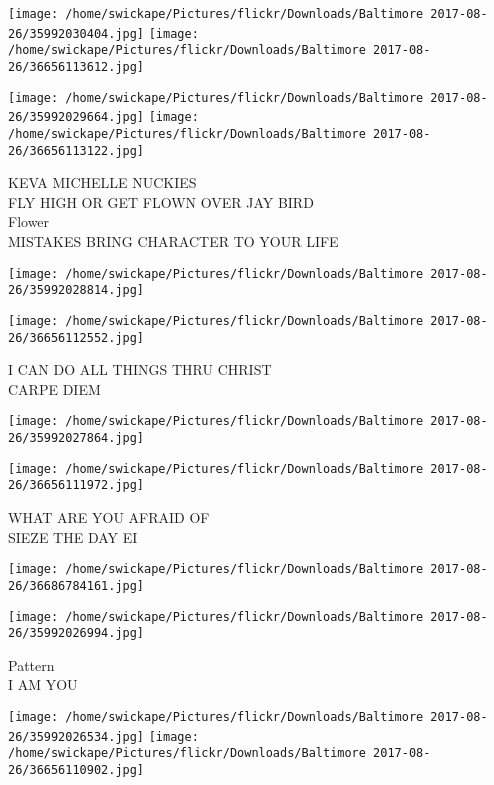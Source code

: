 \documentclass[10pt,letterpaper]{article}
\begin{document}
\texttt{[image: /home/swickape/Pictures/flickr/Downloads/Baltimore 2017-08-26/35992030404.jpg]}
\texttt{[image: /home/swickape/Pictures/flickr/Downloads/Baltimore 2017-08-26/36656113612.jpg]}

\texttt{[image: /home/swickape/Pictures/flickr/Downloads/Baltimore 2017-08-26/35992029664.jpg]}
\texttt{[image: /home/swickape/Pictures/flickr/Downloads/Baltimore 2017-08-26/36656113122.jpg]}

KEVA MICHELLE NUCKIES\\
FLY HIGH OR GET FLOWN OVER JAY BIRD\\
Flower\\
MISTAKES BRING CHARACTER TO YOUR LIFE\\
\pagebreak

\texttt{[image: /home/swickape/Pictures/flickr/Downloads/Baltimore 2017-08-26/35992028814.jpg]}

\vspace{0.25in}
\texttt{[image: /home/swickape/Pictures/flickr/Downloads/Baltimore 2017-08-26/36656112552.jpg]}

I CAN DO ALL THINGS THRU CHRIST\\
CARPE DIEM\\
\pagebreak

\texttt{[image: /home/swickape/Pictures/flickr/Downloads/Baltimore 2017-08-26/35992027864.jpg]}

\vspace{0.25in}
\texttt{[image: /home/swickape/Pictures/flickr/Downloads/Baltimore 2017-08-26/36656111972.jpg]}

WHAT ARE YOU AFRAID OF\\
SIEZE THE DAY EI\\
\pagebreak

\texttt{[image: /home/swickape/Pictures/flickr/Downloads/Baltimore 2017-08-26/36686784161.jpg]}

\vspace{0.25in}
\texttt{[image: /home/swickape/Pictures/flickr/Downloads/Baltimore 2017-08-26/35992026994.jpg]}

Pattern\\
I AM YOU\\
\pagebreak

\texttt{[image: /home/swickape/Pictures/flickr/Downloads/Baltimore 2017-08-26/35992026534.jpg]}
\texttt{[image: /home/swickape/Pictures/flickr/Downloads/Baltimore 2017-08-26/36656110902.jpg]}
\end{document}
